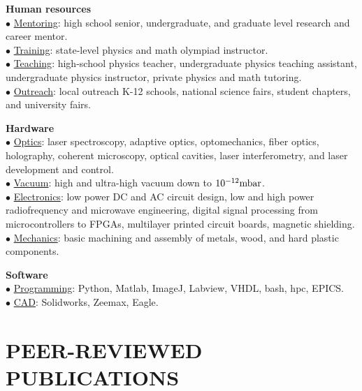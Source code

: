 \documentclass[margin]{res} %
\begin{document}
\begin{resume}
{\bf Human resources}\\
$\bullet$ \underline{Mentoring}: high school senior, undergraduate, and graduate level research and career mentor.\\
$\bullet$ \underline{Training}: state-level physics and math olympiad instructor.\\
$\bullet$ \underline{Teaching}: high-school physics teacher, undergraduate physics teaching assistant, undergraduate physics instructor, private physics and math tutoring.\\
$\bullet$ \underline{Outreach}: local outreach K-12 schools, national science fairs, student chapters, and university fairs.

{\bf Hardware}\\
$\bullet$ \underline{Optics}: laser spectroscopy, adaptive optics, optomechanics, fiber optics, holography, coherent microscopy, optical cavities, laser interferometry, and laser development and control.\\
$\bullet$ \underline{Vacuum}: high and ultra-high vacuum down to ${10^{-12} {\rm mbar}}$.\\
$\bullet$ \underline{Electronics}: low power DC and AC circuit design, low and high power radiofrequency and microwave engineering, digital signal processing from microcontrollers to FPGAs, multilayer printed circuit boards, magnetic shielding.\\
$\bullet$ \underline{Mechanics}: basic machining and assembly of metals, wood, and hard plastic components.

{\bf Software}\\ 
$\bullet$ \underline{Programming}: Python, Matlab, ImageJ, Labview, VHDL, bash, hpc, EPICS.\\
$\bullet$ \underline{CAD}: Solidworks, Zeemax, Eagle.

\end{resume}






\section{PEER-REVIEWED PUBLICATIONS}
\end{document}
